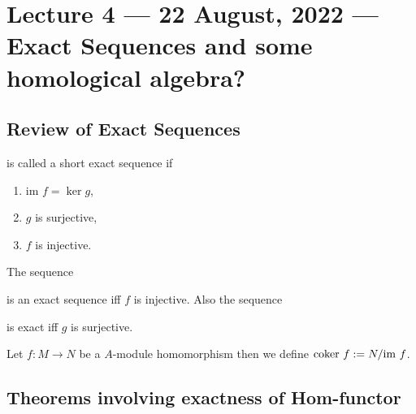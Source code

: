 \section{Lecture 4 --- 22 August, 2022 --- Exact Sequences and some homological algebra?}
\subsection{Review of Exact Sequences}
\begin{definition}
    is called a short exact sequence if 
    \begin{enumerate}
	\item $\text{im } f = \ker g$,
	\item $g$ is surjective,
	\item $f$ is injective.
    \end{enumerate}
    \label{def:short-exact-sequence}
\end{definition}

\begin{remark}
    The sequence
    is an exact sequence iff $f$ is injective. Also the sequence 
    is exact iff $g$ is surjective.
    \label{rem:exact-inj-sur}
\end{remark}

\begin{definition}
    Let $f: M \to N$ be a $A$-module homomorphism then we define $\text{coker }f := N/{\text{im }} f$.
    \label{def:coker}
\end{definition}

\subsection{Theorems involving exactness of Hom-functor}

